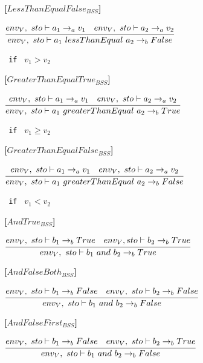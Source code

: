 \textbf{[$LessThanEqualFalse_{BSS}$]}
\begin{center}
	\begin{math}
	\cfrac
	{env_V,\ sto \vdash a_1 \rightarrow_a v_1 \quad env_V,\ sto \vdash a_2 \rightarrow_a v_2}
	{env_V,\ sto \vdash a_1\ lessThanEqual\ a_2 \rightarrow_b False}
	\end{math}
	
	\texttt{ if } $v_1 > v_2$
\end{center}

\textbf{[$GreaterThanEqualTrue_{BSS}$]}
\begin{center}
	\begin{math}
	\cfrac
	{env_V,\ sto \vdash a_1 \rightarrow_a v_1 \quad env_V,\ sto \vdash a_2 \rightarrow_a v_2}
	{env_V,\ sto \vdash a_1\ greaterThanEqual\ a_2 \rightarrow_b True}
	\end{math}
	
	\texttt{ if } $v_1 \geq v_2$
\end{center}

\textbf{[$GreaterThanEqualFalse_{BSS}$]}
\begin{center}
	\begin{math}
	\cfrac
	{env_V,\ sto \vdash a_1 \rightarrow_a v_1 \quad env_V,\ sto \vdash a_2 \rightarrow_a v_2}
	{env_V,\ sto \vdash a_1\ greaterThanEqual\ a_2 \rightarrow_b False}
	\end{math}
	
	\texttt{ if } $v_1 < v_2$
\end{center}

\textbf{[$AndTrue_{BSS}$]}
\begin{center}
	\begin{math}
	\cfrac
		{env_V,\ sto \vdash b_1 \rightarrow_b True \quad env_V, sto \vdash b_2 \rightarrow_b True}
		{env_V,\ sto \vdash b_1\ and\ b_2 \rightarrow_b True}
	\end{math}
\end{center}

\textbf{[$AndFalseBoth_{BSS}$]}
\begin{center}
	\begin{math}
	\cfrac
		{env_V,\ sto \vdash b_1 \rightarrow_b False \quad env_V,\ sto \vdash b_2 \rightarrow_b False}
		{env_V,\ sto \vdash b_1\ and\ b_2 \rightarrow_b False}
	\end{math}
\end{center}

\textbf{[$AndFalseFirst_{BSS}$]}
\begin{center}
	\begin{math}
	\cfrac
	{env_V,\ sto \vdash b_1 \rightarrow_b False \quad env_V,\ sto \vdash b_2 \rightarrow_b True}
	{env_V,\ sto \vdash b_1\ and\ b_2 \rightarrow_b False}
	\end{math}
\end{center}


